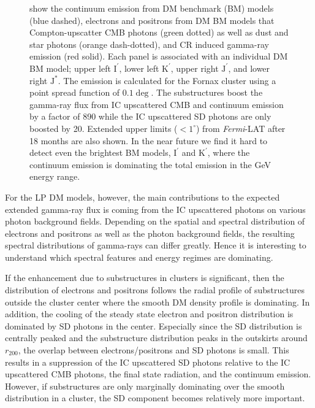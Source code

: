 \documentclass[10pt,aps,pra,reprint,amsmath,amsfonts,amssymb,showpacs,nofootinbib,floatfix]{revtex4-1}
\newcommand{\Fermi}{{\em Fermi}\xspace}
\newcommand{\rmn}{\mathrm}
\newcommand{\Kp}{\rmn{K}^\prime}
\newcommand{\Ip}{\rmn{I}^\prime}
\newcommand{\Js}{\rmn{J}^*}
\newcommand{\Jp}{\rmn{J}^\prime}
\newcommand{\rvir}{r_{200}}
\begin{document}
\begin{figure}
\begin{minipage}{2.0\columnwidth}
{  show the continuum emission from DM benchmark (BM) models (blue
  dashed), electrons and positrons from DM BM models that
  Compton-upscatter CMB photons (green dotted) as well as dust and
  star photons (orange dash-dotted), and CR induced gamma-ray emission
  (red solid). Each panel is associated with an individual DM BM
  model; upper left $\Ip$, lower left $\Kp$, upper right $\Jp$, and
  lower right $\Js$. The emission is calculated for the Fornax cluster
  using a point spread function of $0.1\deg$. The substructures boost
  the gamma-ray flux from IC upscattered CMB and continuum emission by
  a factor of 890 while the IC upscattered SD photons are only boosted
  by 20. Extended upper limits ($<1^\circ$) from \Fermi-LAT after 18
  months \protect \cite{2010ApJ...717L..71A} are also shown. In the
  near future we find it hard to detect even the brightest BM models,
  $\Ip$ and $\Kp$, where the continuum emission is dominating the
  total emission in the GeV energy range.}
 \label{fig:diff_BM}
\end{minipage}
\end{figure}

For the LP DM models, however, the main contributions
to the expected extended gamma-ray flux is coming from the IC
upscattered photons on various photon background fields. Depending on
the spatial and spectral distribution of electrons and positrons as
well as the photon background fields, the resulting spectral
distributions of gamma-rays can differ greatly. Hence it is interesting
to understand which spectral features and energy regimes are
dominating.

If the enhancement due to substructures in clusters is significant,
then the distribution of electrons and positrons follows the radial
profile of substructures outside the cluster center where the smooth
DM density profile is dominating. In addition, the cooling of the
steady state electron and positron distribution is dominated by SD
photons in the center. Especially since the SD distribution is
centrally peaked and the substructure distribution peaks in the
outskirts around $\rvir$, the overlap between electrons/positrons and
SD photons is small. This results in a suppression of the IC
upscattered SD photons relative to the IC upscattered CMB photons, the
final state radiation, and the continuum emission. However, if
substructures are only marginally dominating over the smooth
distribution in a cluster, the SD component becomes relatively more
important.
\end{document}

